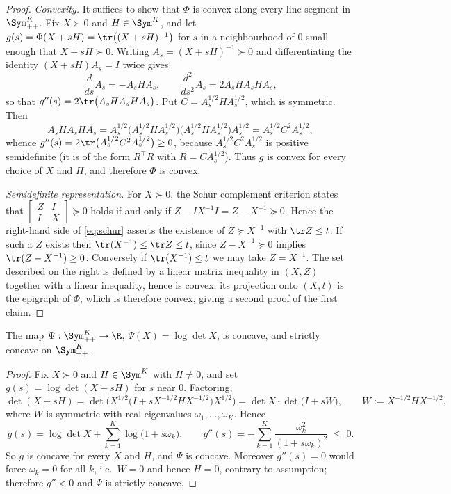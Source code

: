 \begin{proof}
\emph{Convexity.} It suffices to show that $\Phi$ is convex along every line
segment in $\Sym^{K}_{++}$. Fix $X\succ0$ and $H\in\Sym^{K}$, and let
$g(s)=\Phi(X+sH)=\tr\big((X+sH)^{-1}\big)$ for $s$ in a neighbourhood of $0$
small enough that $X+sH\succ0$. Writing $A_s=(X+sH)^{-1}\succ0$ and
differentiating the identity $(X+sH)A_s=I$ twice gives
\[
  \frac{d}{ds}A_s=-A_sHA_s,
  \qquad
  \frac{d^{2}}{ds^{2}}A_s=2A_sHA_sHA_s ,
\]
so that $g''(s)=2\tr\big(A_sHA_sHA_s\big)$. Put $C=A_s^{1/2}HA_s^{1/2}$, which is
symmetric. Then
\[
  A_sHA_sHA_s
  =A_s^{1/2}\big(A_s^{1/2}HA_s^{1/2}\big)\big(A_s^{1/2}HA_s^{1/2}\big)A_s^{1/2}
  =A_s^{1/2}C^{2}A_s^{1/2},
\]
whence $g''(s)=2\tr\big(A_s^{1/2}C^{2}A_s^{1/2}\big)\ge0$, because
$A_s^{1/2}C^{2}A_s^{1/2}$ is positive semidefinite (it is of the form $R^\top R$
with $R=CA_s^{1/2}$). Thus $g$ is convex for every choice of $X$ and $H$, and
therefore $\Phi$ is convex.

\emph{Semidefinite representation.} For $X\succ0$, the Schur complement
criterion states that
$\left[\begin{smallmatrix} Z & I\\ I & X\end{smallmatrix}\right]\succeq0$
holds if and only if $Z-IX^{-1}I=Z-X^{-1}\succeq0$. Hence the right-hand side of
\eqref{eq:schur} asserts the existence of $Z\succeq X^{-1}$ with $\tr Z\le t$. If
such a $Z$ exists then $\tr(X^{-1})\le\tr Z\le t$, since $Z-X^{-1}\succeq0$
implies $\tr(Z-X^{-1})\ge0$. Conversely if $\tr(X^{-1})\le t$ we may take
$Z=X^{-1}$. The set described on the right is defined by a linear matrix
inequality in $(X,Z)$ together with a linear inequality, hence is convex; its
projection onto $(X,t)$ is the epigraph of $\Phi$, which is therefore convex,
giving a second proof of the first claim.
\end{proof}

\begin{lemma}
\label{lem:logdet}
The map $\Psi:\Sym^{K}_{++}\to\R$, $\Psi(X)=\log\det X$, is concave, and strictly
concave on $\Sym^{K}_{++}$.
\end{lemma}

\begin{proof}
Fix $X\succ0$ and $H\in\Sym^{K}$ with $H\neq0$, and set
$g(s)=\log\det(X+sH)$ for $s$ near $0$. Factoring,
\[
  \det(X+sH)=\det\!\big(X^{1/2}\big(I+sX^{-1/2}HX^{-1/2}\big)X^{1/2}\big)
  =\det X\cdot\det\!\big(I+sW\big),
  \qquad W:=X^{-1/2}HX^{-1/2},
\]
where $W$ is symmetric with real eigenvalues $\omega_1,\dots,\omega_K$. Hence
\[
  g(s)=\log\det X+\sum_{k=1}^{K}\log\big(1+s\omega_k\big),
  \qquad
  g''(s)=-\sum_{k=1}^{K}\frac{\omega_k^{2}}{(1+s\omega_k)^{2}}\;\le\;0 .
\]
So $g$ is concave for every $X$ and $H$, and $\Psi$ is concave. Moreover
$g''(s)=0$ would force $\omega_k=0$ for all $k$, i.e.\ $W=0$ and hence $H=0$,
contrary to assumption; therefore $g''<0$ and $\Psi$ is strictly concave.
\end{proof}

